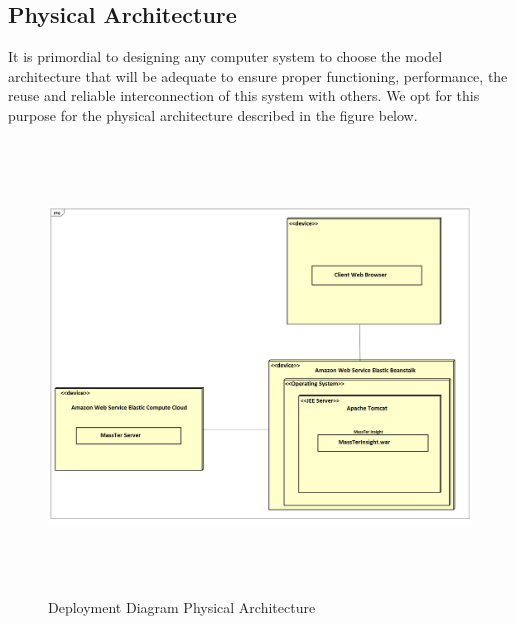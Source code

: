 	\subsection{Physical Architecture}
	It is primordial to designing any computer system to choose the model architecture that will be adequate to ensure proper functioning, performance, the reuse and reliable interconnection of this system with others. We opt for this purpose for the physical architecture described in the figure below.
	\begin{figure}[h]
		\centering
		\includegraphics[width=16.5cm,height=12cm]{DeploymentDiagramPhysicalArchitecture.png}
		\caption{Deployment Diagram Physical Architecture}
	\end{figure}  

	\clearpage
    \newpage  
	
